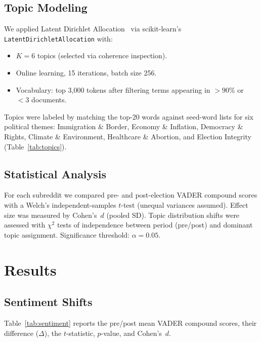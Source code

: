 \documentclass[journal]{IEEEtran}
\begin{document}
\subsection{Topic Modeling}

We applied Latent Dirichlet Allocation~\cite{blei2003latent} via
scikit-learn's \texttt{LatentDirichletAllocation} with:
\begin{itemize}
  \item $K = 6$ topics (selected via coherence inspection).
  \item Online learning, 15 iterations, batch size 256.
  \item Vocabulary: top 3,000 tokens after filtering terms appearing
        in $>90\%$ or $<3$ documents.
\end{itemize}
Topics were labeled by matching the top-20 words against seed-word
lists for six political themes: Immigration \& Border, Economy \&
Inflation, Democracy \& Rights, Climate \& Environment, Healthcare \&
Abortion, and Election Integrity (Table~\ref{tab:topics}).

\subsection{Statistical Analysis}

For each subreddit we compared pre- and post-election VADER compound
scores with a Welch's independent-samples $t$-test (unequal variances
assumed). Effect size was measured by Cohen's~$d$ (pooled SD). Topic
distribution shifts were assessed with $\chi^2$ tests of independence
between period (pre/post) and dominant topic assignment.
Significance threshold: $\alpha = 0.05$.

\section{Results}

\subsection{Sentiment Shifts}

Table~\ref{tab:sentiment} reports the pre/post mean VADER compound
scores, their difference ($\Delta$), the $t$-statistic, $p$-value, and
Cohen's~$d$.
\end{document}
